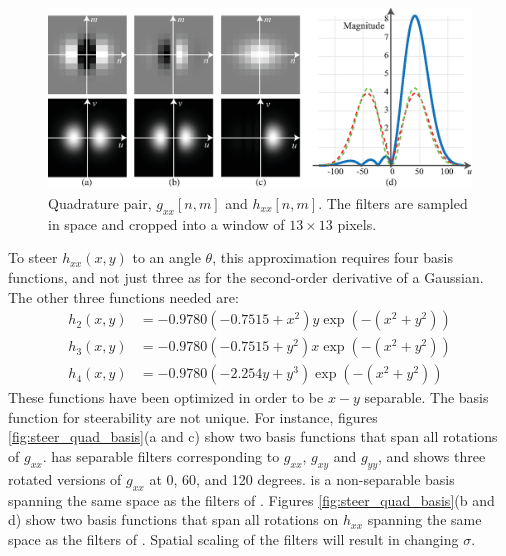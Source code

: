 \begin{figure}[t]
	\centerline{
		\includegraphics[width=1\linewidth]{figures/spatial_filter_sets/steer_quad_aprox_a.eps}
	}
	\caption{Quadrature pair, $g_{xx} \left[n,m \right]$ and $h_{xx} \left[n,m \right]$. The filters are sampled in space and cropped into a window of $13\times13$ pixels.}
	\label{fig:steerg2h2}
\end{figure}


To steer $h_{xx}(x,y)$ to an angle $\theta$, this approximation requires four basis functions, and not just three as for the second-order derivative of a Gaussian. The other three functions needed are:
\begin{equation}
	\begin{split}
		h_2(x,y) & = -0.9780(-0.7515+x^2) y \exp \left(-(x^2+y^2) \right) \\
		h_3(x,y) & = -0.9780(-0.7515+y^2) x \exp \left(-(x^2+y^2) \right) \\
		h_4(x,y) & = -0.9780 (-2.254 y+y^3) \exp \left(-(x^2+y^2) \right)
	\end{split}
\end{equation}
These functions have been optimized in order to be $x-y$ separable. The basis function for steerability are not unique. For instance, figures \ref{fig:steer_quad_basis}(a and c) show two basis functions that span all rotations of $g_{xx}$.  has separable filters corresponding to $g_{xx}$, $g_{xy}$ and $g_{yy}$, and  shows three rotated versions of $g_{xx}$ at 0, 60, and 120 degrees.  is a non-separable basis spanning the same space as the filters of . Figures \ref{fig:steer_quad_basis}(b and d) show two basis functions that span all rotations on $h_{xx}$ spanning the same
space as the filters of . Spatial scaling of the filters will result in changing $\sigma$.


